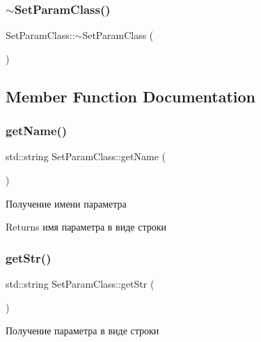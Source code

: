 \subsubsection{\texorpdfstring{$\sim$\+Set\+Param\+Class()}{~SetParamClass()}}
{\footnotesize\ttfamily Set\+Param\+Class\+::$\sim$\+Set\+Param\+Class (\begin{DoxyParamCaption}{ }\end{DoxyParamCaption})}



\subsection{Member Function Documentation}
\mbox{\label{class_set_param_class_a6c14fce9f4a896f6470888f3cacfb025}} 
\subsubsection{\texorpdfstring{get\+Name()}{getName()}}
{\footnotesize\ttfamily std\+::string Set\+Param\+Class\+::get\+Name (\begin{DoxyParamCaption}{ }\end{DoxyParamCaption})}



Получение имени параметра 

\begin{DoxyReturn}{Returns}
имя параметра в виде строки 
\end{DoxyReturn}
\mbox{\label{class_set_param_class_a44f3924827807beb6805867a0305e8c9}} 
\subsubsection{\texorpdfstring{get\+Str()}{getStr()}}
{\footnotesize\ttfamily std\+::string Set\+Param\+Class\+::get\+Str (\begin{DoxyParamCaption}{ }\end{DoxyParamCaption})\hspace{0.3cm}{\ttfamily [virtual]}}



Получение параметра в виде строки 

